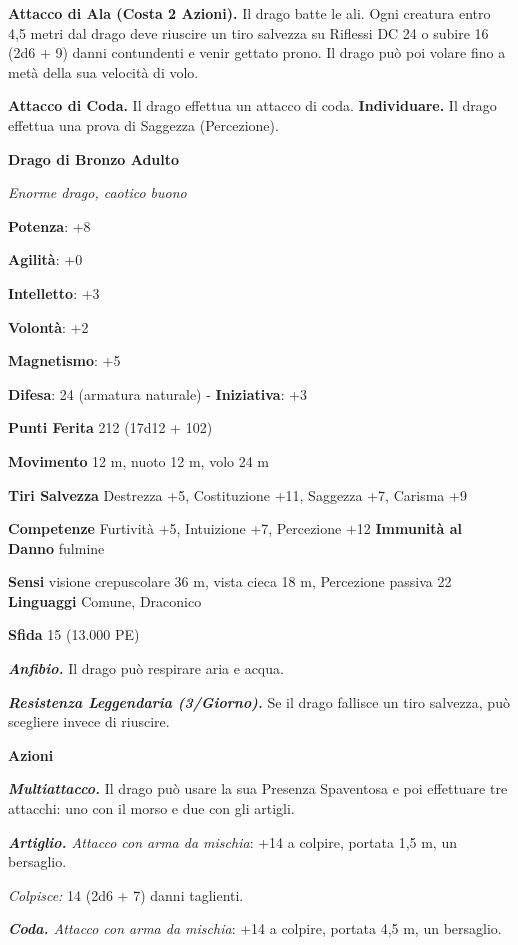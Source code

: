 \begin{multicols}{2}
\textbf{Attacco di Ala (Costa 2 Azioni).} Il drago batte le ali. Ogni
creatura entro 4,5 metri dal drago deve riuscire un tiro salvezza su Riflessi DC 24 o subire 16 (2d6 + 9) danni contundenti e venir gettato
prono. Il drago può poi volare fino a metà della sua velocità di volo.

\textbf{Attacco di Coda.} Il drago effettua un attacco di coda.
\textbf{Individuare.} Il drago effettua una prova di Saggezza
(Percezione).

\textbf{Drago di Bronzo Adulto}

\emph{Enorme drago, caotico buono}

\textbf{Potenza}: +8

\textbf{Agilità}: +0

\textbf{Intelletto}: +3

\textbf{Volontà}: +2

\textbf{Magnetismo}: +5

\textbf{Difesa}: 24 (armatura naturale) - \textbf{Iniziativa}: +3

\textbf{Punti Ferita} 212 (17d12 + 102)

\textbf{Movimento} 12 m, nuoto 12 m, volo 24 m

\textbf{Tiri Salvezza} Destrezza +5, Costituzione +11, Saggezza +7,
Carisma +9

\textbf{Competenze} Furtività +5, Intuizione +7, Percezione +12
\textbf{Immunità al Danno} fulmine

\textbf{Sensi} visione crepuscolare 36 m, vista cieca 18 m, Percezione passiva
22 \textbf{Linguaggi} Comune, Draconico

\textbf{Sfida} 15 (13.000 PE)

\emph{\textbf{Anfibio.}} Il drago può respirare aria e acqua.

\emph{\textbf{Resistenza Leggendaria (3/Giorno).}} Se il drago fallisce
un tiro salvezza, può scegliere invece di riuscire.

\textbf{Azioni}

\emph{\textbf{Multiattacco.}} Il drago può usare la sua Presenza
Spaventosa e poi effettuare tre attacchi: uno con il morso e due con gli
artigli.

\emph{\textbf{Artiglio.} Attacco con arma da mischia}: +14 a colpire,
portata 1,5 m, un bersaglio.

\emph{Colpisce:} 14 (2d6 + 7) danni taglienti.

\emph{\textbf{Coda.} Attacco con arma da mischia}: +14 a colpire,
portata 4,5 m, un bersaglio.


\end{multicols}
